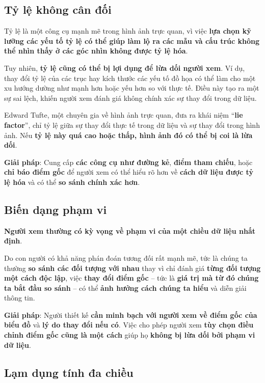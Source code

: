 \subsection{Tỷ lệ không cân
đối}\label{tux1ef7-lux1ec7-khuxf4ng-cuxe2n-ux111ux1ed1i}

Tỷ lệ là một công cụ mạnh mẽ trong hình ảnh trực quan, vì việc
\textbf{lựa chọn kỹ lưỡng các yếu tố tỷ lệ có thể giúp làm lộ ra các mẫu
và cấu trúc không thể nhìn thấy ở các góc nhìn không được tỷ lệ hóa}.

Tuy nhiên, \textbf{tỷ lệ cũng có thể bị lợi dụng để lừa dối người xem}.
Ví dụ, thay đổi tỷ lệ của các trục hay kích thước các yếu tố đồ họa có
thể làm cho một xu hướng dường như mạnh hơn hoặc yếu hơn so với thực tế.
Điều này tạo ra một sự sai lệch, khiến người xem đánh giá không chính
xác sự thay đổi trong dữ liệu.

Edward Tufte, một chuyên gia về hình ảnh trực quan, đưa ra khái niệm
``\textbf{lie factor}'', chỉ tỷ lệ giữa sự thay đổi thực tế trong dữ
liệu và sự thay đổi trong hình ảnh. Nếu \textbf{tỷ lệ này quá cao hoặc
thấp, hình ảnh đó có thể bị coi là lừa dối}.

\textbf{Giải pháp}: Cung cấp \textbf{các công cụ như đường kẻ},
\textbf{điểm tham chiếu}, hoặc \textbf{chỉ báo điểm gốc} để người xem có
thể hiểu rõ hơn về \textbf{cách dữ liệu được tỷ lệ hóa} và có thể
\textbf{so sánh chính xác hơn}.

\subsection{Biến dạng phạm vi}\label{biux1ebfn-dux1ea1ng-phux1ea1m-vi}

\textbf{Người xem thường có kỳ vọng về phạm vi của một chiều dữ liệu
nhất định}.

Do con người có khả năng phán đoán tương đối rất mạnh mẽ, tức là chúng
ta thường \textbf{so sánh các đối tượng với nhau} thay vì chỉ đánh giá
\textbf{từng đối tượng một cách độc lập}, việc \textbf{thay đổi điểm
gốc} -- tức là \textbf{giá trị mà từ đó chúng ta bắt đầu so sánh} -- có
thể \textbf{ảnh hưởng cách chúng ta hiểu} và diễn giải thông tin.

\textbf{Giải pháp}: Người thiết kế \textbf{cần minh bạch với người xem
về điểm gốc của biểu đồ} và \textbf{lý do thay đổi nếu có}. Việc cho
phép người xem \textbf{tùy chọn điều chỉnh điểm gốc cũng là một cách}
giúp họ \textbf{không bị lừa dối bởi phạm vi dữ liệu}.

\subsection{\texorpdfstring{\textbf{Lạm dụng tính đa
chiều}}{Lạm dụng tính đa chiều}}\label{lux1ea1m-dux1ee5ng-tuxednh-ux111a-chiux1ec1u}

